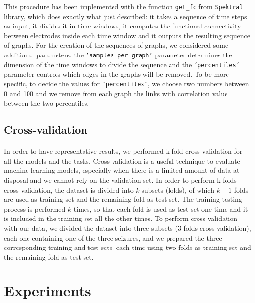 This procedure has been implemented with the function \texttt{get\_fc} from \texttt{Spektral} library, which does exactly what just described: it takes a sequence of time steps as input, it divides it in time windows, it computes the functional connectivity between electrodes inside each time window and it outputs the resulting sequence of graphs. For the creation of the sequences of graphs, we considered some additional parameters: the \texttt{'samples per graph'} parameter determines the dimension of the time windows to divide the sequence and the \texttt{'percentiles'} parameter controls which edges in the graphs will be removed. To be more specific, to decide the values for \texttt{'percentiles'}, we choose two numbers between 0 and 100 and we remove from each graph the links with correlation value between the two percentiles.

\subsection{Cross-validation}
\paragraph{} In order to have representative results, we performed k-fold cross validation for all the models and the tasks. Cross validation is a useful technique to evaluate machine learning models, especially when there is a limited amount of data at disposal and we cannot rely on the validation set. In order to perform k-folds cross validation, the dataset is divided into $k$ subsets (folds), of which $k-1$ folds are used as training set and the remaining fold as test set. The training-testing process is performed $k$ times, so that each fold is used as test set one time and it is included in the training set all the other times. To perform cross validation with our data, we divided the dataset into three subsets (3-folds cross validation), each one containing one of the three seizures, and we prepared the three corresponding training and test sets, each time using two folds as training set and the remaining fold as test set.


\section{Experiments} \label{sec: experiments}
